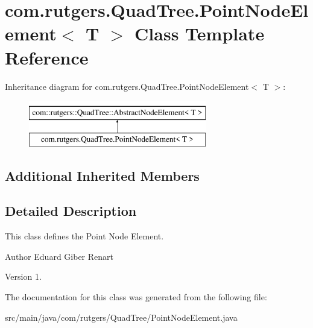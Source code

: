 \hypertarget{classcom_1_1rutgers_1_1QuadTree_1_1PointNodeElement}{}\section{com.\+rutgers.\+Quad\+Tree.\+Point\+Node\+Element$<$ T $>$ Class Template Reference}
\label{classcom_1_1rutgers_1_1QuadTree_1_1PointNodeElement}
Inheritance diagram for com.\+rutgers.\+Quad\+Tree.\+Point\+Node\+Element$<$ T $>$\+:\begin{figure}[H]
\begin{center}
\leavevmode
\includegraphics[height=2.000000cm]{classcom_1_1rutgers_1_1QuadTree_1_1PointNodeElement}
\end{center}
\end{figure}
\subsection*{Additional Inherited Members}


\subsection{Detailed Description}
This class defines the Point Node Element.

\begin{DoxyAuthor}{Author}
Eduard Giber Renart 
\end{DoxyAuthor}
\begin{DoxyVersion}{Version}
1. 
\end{DoxyVersion}


The documentation for this class was generated from the following file\+:\begin{DoxyCompactItemize}
\item 
src/main/java/com/rutgers/\+Quad\+Tree/Point\+Node\+Element.\+java\end{DoxyCompactItemize}

